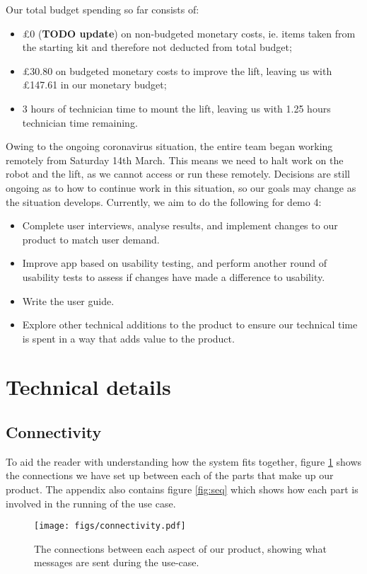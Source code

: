 \documentclass{article}
\begin{document}
Our total budget spending so far consists of:
\begin{itemize}
  \item \pounds 0 ({\bf TODO update}) on non-budgeted monetary costs, ie. items taken from the starting kit and therefore not deducted from total budget;
  \item \pounds 30.80 on budgeted monetary costs to improve the lift, leaving us with \pounds 147.61 in our monetary budget; 
  \item 3 hours of technician time to mount the lift, leaving us with 1.25 hours technician time remaining. 
\end{itemize}

Owing to the ongoing coronavirus situation, the entire team began working remotely from Saturday 14th March. This means we need to halt work on the robot and the lift, as we cannot access or run these remotely. Decisions are still ongoing as to how to continue work in this situation, so our goals may change as the situation develops. Currently, we aim to do the following for demo 4:
\begin{itemize}
  \item Complete user interviews, analyse results, and implement changes to our product to match user demand.
  \item Improve app based on usability testing, and perform another round of usability tests to assess if changes have made a difference to usability. 
  \item Write the user guide. 
  \item Explore other technical additions to the product to ensure our technical time is spent in a way that adds value to the product. 
\end{itemize}

\section{Technical details}
\subsection{Connectivity}
To aid the reader with understanding how the system fits together, figure \ref{fig:connect} shows the connections we have set up between each of the parts that make up our product. The appendix also contains figure \ref{fig:seq} which shows how each part is involved in the running of the use case.
\begin{figure}
  \begin{center}
    \texttt{[image: figs/connectivity.pdf]}
  \end{center}
  \caption{The connections between each aspect of our product, showing what messages are sent during the use-case.}
  \label{fig:connect}
\end{figure}
\end{document}
